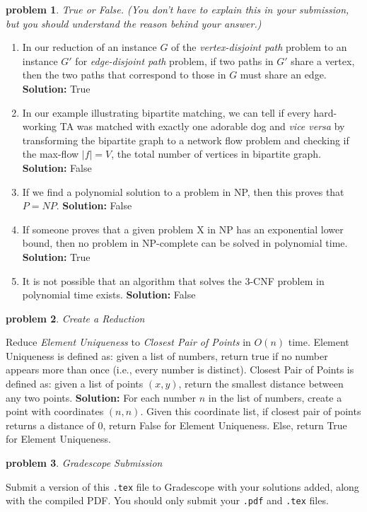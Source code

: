 \documentclass[10pt]{article}
\newcommand{\solution}[1]{\color{blue}\hfill\break\noindent\textbf{Solution:} #1\color{black}}
\newtheorem{problem}{\sc\color{cit}problem}
\begin{document}
\begin{problem} True or False. (You don't have to explain this in your submission, but you should understand the reason behind your answer.)  \end{problem}

\begin{enumerate}
\renewcommand{\theenumi}{\Alph{enumi}}

\item In our reduction of an instance $G$ of the \emph{vertex-disjoint path} problem to an instance $G'$ for \emph{edge-disjoint path} problem, if two paths in $G'$ share a vertex, then the two paths that correspond to those in $G$ must share an edge.
\solution{
    True
}

\item In our example illustrating bipartite matching, we can tell if every hard-working TA was matched with exactly one adorable dog and \textit{vice versa} by transforming the bipartite graph to a network flow problem and checking if the max-flow $|f| = V$, the total number of vertices in bipartite graph.
\solution{
    False
}

\item If we find a polynomial solution to a problem in NP, then this proves that $P=NP$.
\solution{
    False
}

\item If someone proves that a given problem X in NP has an exponential lower bound, then no problem in NP-complete can be solved in polynomial time. 
\solution{
    True
}

\item It is not possible that an algorithm that solves the 3-CNF problem in polynomial time exists.
\solution{
    False
}

\end{enumerate}


\begin{problem}Create a Reduction\end{problem}
Reduce \textit{Element Uniqueness} to \textit{Closest Pair of Points} in $O(n)$ time.  Element Uniqueness is defined as: given a list of numbers, return true if no number appears more than once (i.e., every number is distinct).  Closest Pair of Points is defined as: given a list of points $(x,y)$, return the smallest distance between any two points.
\solution{
    For each number $n$ in the list of numbers, create a point with coordinates $(n, n)$. Given this coordinate list, if closest pair of points returns a distance of $0$, return False for Element Uniqueness. Else, return True for Element Uniqueness.
}

\begin{problem} Gradescope Submission \end{problem}
Submit a version of this \verb|.tex| file to Gradescope with your solutions added, along with the compiled PDF.  You should only submit your \verb|.pdf| and \verb|.tex| files.
\end{document}
